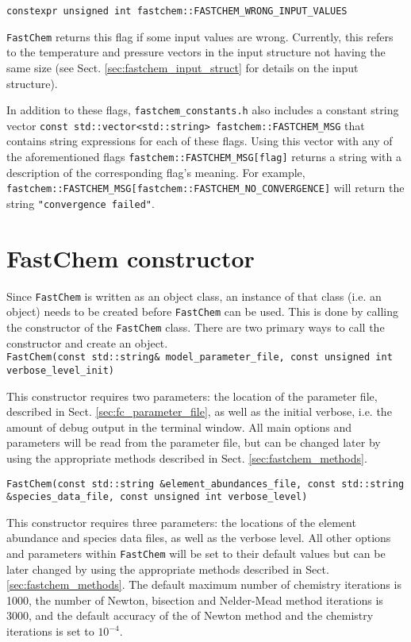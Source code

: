 \documentclass[numbers=noenddot]{aux/fcmanual}
\newcommand{\fc}{\texttt{FastChem}\xspace}
\begin{document}
\bigbreak

\lstinline!constexpr unsigned int fastchem::FASTCHEM_WRONG_INPUT_VALUES!
\begin{addmargin}[25pt]{0pt}
  \fc returns this flag if some input values are wrong. Currently, this refers to the temperature and pressure vectors in the input structure not having the same size (see Sect. \ref{sec:fastchem_input_struct} for details on the input structure). \\
\end{addmargin}

In addition to these flags, \verb|fastchem_constants.h| also includes a constant string vector \lstinline!const std::vector<std::string> fastchem::FASTCHEM_MSG! that contains string expressions for each of these flags. Using this vector with any of the aforementioned flags \lstinline!fastchem::FASTCHEM_MSG[flag]! returns a string with a description of the corresponding flag's meaning. For example, \lstinline!fastchem::FASTCHEM_MSG[fastchem::FASTCHEM_NO_CONVERGENCE]! will return the string \lstinline!"convergence failed"!.


\section{FastChem constructor}
Since \fc is written as an object class, an instance of that class (i.e. an object) needs to be created before \fc can be used. This is done by calling the constructor of the \fc class. There are two primary ways to call the constructor and create an object.\\

\lstinline!FastChem(const std::string& model_parameter_file, const unsigned int verbose_level_init)!
\begin{addmargin}[25pt]{0pt}
  This constructor requires two parameters: the location of the parameter file, described in Sect. \ref{sec:fc_parameter_file}, as well as the initial verbose, i.e. the amount of debug output in the terminal window. All main options and parameters will be read from the parameter file, but can be changed later by using the appropriate methods described in Sect. \ref{sec:fastchem_methods}.
\end{addmargin}

\bigbreak

\lstinline[breaklines=true]!FastChem(const std::string &element_abundances_file, const std::string &species_data_file, const unsigned int verbose_level)!
\begin{addmargin}[25pt]{0pt}
  This constructor requires three parameters: the locations of the element abundance and species data files, as well as the verbose level. All other options and parameters within \fc will be set to their default values but can be later changed by using the appropriate methods described in Sect. \ref{sec:fastchem_methods}. The default maximum number of chemistry iterations is 1000, the number of Newton, bisection and Nelder-Mead method iterations is 3000, and the default accuracy of the of Newton method and the chemistry iterations is set to $10^{-4}$.
\end{addmargin}
\end{document}
